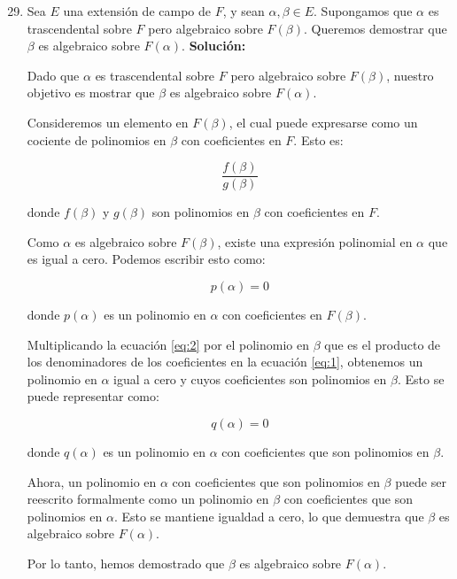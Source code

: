 \begin{enumerate}
\setcounter{enumi}{28}
\item Sea $E$ una extensión de campo de $F$, y sean $\alpha,\beta \in E$. Supongamos que $\alpha$ es trascendental sobre $F$ pero algebraico sobre $F(\beta)$. Queremos demostrar que $\beta$ es algebraico sobre $F(\alpha)$.
\textbf{Solución:}

Dado que $\alpha$ es trascendental sobre $F$ pero algebraico sobre $F(\beta)$, nuestro objetivo es mostrar que $\beta$ es algebraico sobre $F(\alpha)$.

Consideremos un elemento en $F(\beta)$, el cual puede expresarse como un cociente de polinomios en $\beta$ con coeficientes en $F$. Esto es:

\begin{equation}
    \frac{f(\beta)}{g(\beta)} \label{eq:1}
\end{equation}

donde $f(\beta)$ y $g(\beta)$ son polinomios en $\beta$ con coeficientes en $F$.

Como $\alpha$ es algebraico sobre $F(\beta)$, existe una expresión polinomial en $\alpha$ que es igual a cero. Podemos escribir esto como:

\begin{equation}
    p(\alpha) = 0 \label{eq:2}
\end{equation}

donde $p(\alpha)$ es un polinomio en $\alpha$ con coeficientes en $F(\beta)$.

Multiplicando la ecuación \eqref{eq:2} por el polinomio en $\beta$ que es el producto de los denominadores de los coeficientes en la ecuación \eqref{eq:1}, obtenemos un polinomio en $\alpha$ igual a cero y cuyos coeficientes son polinomios en $\beta$. Esto se puede representar como:

\begin{equation}
    q(\alpha) = 0 \label{eq:3}
\end{equation}

donde $q(\alpha)$ es un polinomio en $\alpha$ con coeficientes que son polinomios en $\beta$.

Ahora, un polinomio en $\alpha$ con coeficientes que son polinomios en $\beta$ puede ser reescrito formalmente como un polinomio en $\beta$ con coeficientes que son polinomios en $\alpha$. Esto se mantiene igualdad a cero, lo que demuestra que $\beta$ es algebraico sobre $F(\alpha)$.

Por lo tanto, hemos demostrado que $\beta$ es algebraico sobre $F(\alpha)$.




\end{enumerate}

